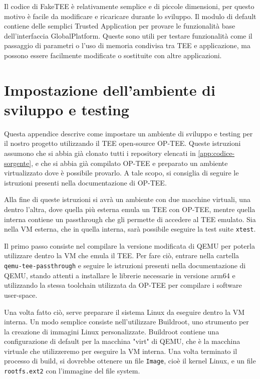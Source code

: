 \documentclass[12pt,italian]{report}
\begin{document}
Il codice di FakeTEE è relativamente semplice e di piccole dimensioni, per
questo motivo è facile da modificare e ricaricare durante lo sviluppo.
Il modulo di default contiene delle semplici Trusted Application per provare
le funzionalità base dell'interfaccia GlobalPlatform.
Queste sono utili per testare funzionalità come il passaggio di parametri o
l'uso di memoria condivisa tra TEE e applicazione, ma possono essere
facilmente modificate o sostituite con altre applicazioni.

\chapter{Impostazione dell'ambiente di sviluppo e testing}
\label{app:impostazione-ambiente-sviluppo-testing}
Questa appendice descrive come impostare un ambiente di sviluppo e testing
per il nostro progetto utilizzando il TEE open-source OP-TEE.
Queste istruzioni assumono che si abbia già clonato tutti i repository
elencati in \ref{app:codice-sorgente}, e che si abbia già compilato OP-TEE e
preparato un ambiente virtualizzato dove è possibile provarlo.
A tale scopo, si consiglia di seguire le istruzioni presenti nella
documentazione di OP-TEE.

Alla fine di queste istruzioni si avrà un ambiente con due macchine virtuali,
una dentro l'altra, dove quella più esterna emula un TEE con OP-TEE, mentre
quella interna contiene un passthrough che gli permette di accedere al TEE
emulato. Sia nella VM esterna, che in quella interna, sarà possibile eseguire
la test suite \texttt{xtest}.

\medbreak

Il primo passo consiste nel compilare la versione modificata di QEMU per
poterla utilizzare dentro la VM che emula il TEE.
Per fare ciò, entrare nella cartella \texttt{qemu-tee-passthrough} e
seguire le istruzioni presenti nella documentazione di QEMU,
stando attenti a installare le librerie necessarie in versione arm64
e utilizzando la stessa toolchain utilizzata da OP-TEE per compilare i
software user-space.

Una volta fatto ciò, serve preparare il sistema Linux da eseguire dentro la
VM interna. Un modo semplice consiste nell'utilizzare Buildroot, uno
strumento per la creazione di immagini Linux personalizzate.
Buildroot contiene una configurazione di default per la macchina "virt"
di QEMU, che è la macchina virtuale che utilizzeremo per eseguire la
VM interna.
Una volta terminato il processo di build, si dovrebbe ottenere un file
\texttt{Image}, cioè il kernel Linux, e un file \texttt{rootfs.ext2} con
l'immagine del file system.
\end{document}
